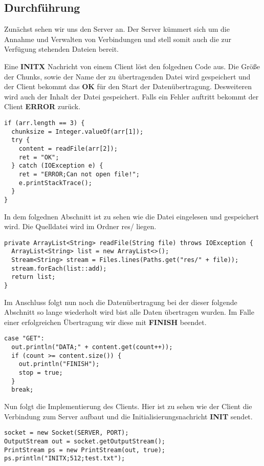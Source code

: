 \subsection{Durchführung}
Zunächst sehen wir uns den Server an. Der Server kümmert sich um die Annahme und Verwalten von Verbindungen und stell somit auch die zur Verfügung stehenden Dateien bereit.

Eine \textbf{INITX} Nachricht von einem Client löst den folgednen Code aus. Die Größe der Chunks, sowie der Name der zu übertragenden Datei wird gespeichert und der Client bekommt das \textbf{OK} für den Start der Datenübertragung. Desweiteren wird auch der Inhalt der Datei gespeichert. Falls ein Fehler auftritt bekommt der Client \textbf{ERROR} zurück.
\begin{lstlisting}
if (arr.length == 3) {
  chunksize = Integer.valueOf(arr[1]);
  try {
    content = readFile(arr[2]);
    ret = "OK";
  } catch (IOException e) {
    ret = "ERROR;Can not open file!";
    e.printStackTrace();
  }
}
\end{lstlisting}

In dem folgednen Abschnitt ist zu sehen wie die Datei eingelesen und gespeichert wird. Die Quelldatei wird im Ordner res/ liegen.
\begin{lstlisting}
private ArrayList<String> readFile(String file) throws IOException {
  ArrayList<String> list = new ArrayList<>();
  Stream<String> stream = Files.lines(Paths.get("res/" + file));
  stream.forEach(list::add);
  return list;
}
\end{lstlisting}

Im Anschluss folgt nun noch die Datenübertragung bei der dieser folgende Abschnitt so lange wiederholt wird bist alle Daten übertragen wurden. Im Falle einer erfolgreichen Übertragung wir diese mit \textbf{FINISH} beendet.
\begin{lstlisting}
case "GET":
  out.println("DATA;" + content.get(count++));
  if (count >= content.size()) {
    out.println("FINISH");
    stop = true;
  }
  break;
\end{lstlisting}

Nun folgt die Implementierung des Clients.
Hier ist zu sehen wie der Client die Verbindung zum Server aufbaut und die Initialisierungsnachricht \textbf{INIT} sendet.
\begin{lstlisting}
socket = new Socket(SERVER, PORT);
OutputStream out = socket.getOutputStream();
PrintStream ps = new PrintStream(out, true);
ps.println("INITX;512;test.txt");
\end{lstlisting}

